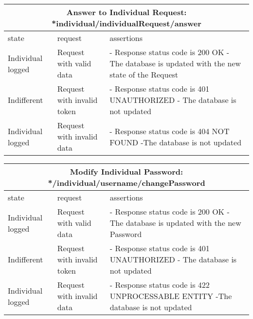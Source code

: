 \begin{center}
	\begin{tabular}{|p{}|p{}|p{}|}
		\hline
		\multicolumn{3}{c}{Answer to Individual Request: *individual/individualRequest/answer}\\

		\hline
		state & request & assertions \\
		
		\hline
		Individual logged&
		Request with valid data & 
		- Response status code is 200 OK\newline
		- The database is updated with the new state of the Request
		\\
		
		\hline
		Indifferent&
		Request with invalid token & 
		- Response status code is 401 UNAUTHORIZED \newline
		- The database is not updated
		\\
		
		\hline
		Individual logged&
		Request with invalid data& 
		- Response status code is 404 NOT FOUND \newline
		-The database is not updated
		\\
		\hline
	\end{tabular}
\end{center}

\begin{center}
	\begin{tabular}{|p{}|p{}|p{}|}
		\hline
		\multicolumn{3}{c}{Modify Individual Password: */individual/username/changePassword}\\

		\hline
		state & request & assertions \\
		
		\hline
		Individual logged&
		Request with valid data & 
		- Response status code is 200 OK\newline
		- The database is updated with the new Password
		\\
		
		\hline
		Indifferent&
		Request with invalid token & 
		- Response status code is 401 UNAUTHORIZED \newline
		- The database is not updated
		\\
		
		\hline
		Individual logged&
		Request with invalid data& 
		- Response status code is 422 UNPROCESSABLE ENTITY \newline
		-The database is not updated
		\\
		\hline
	\end{tabular}
\end{center}

